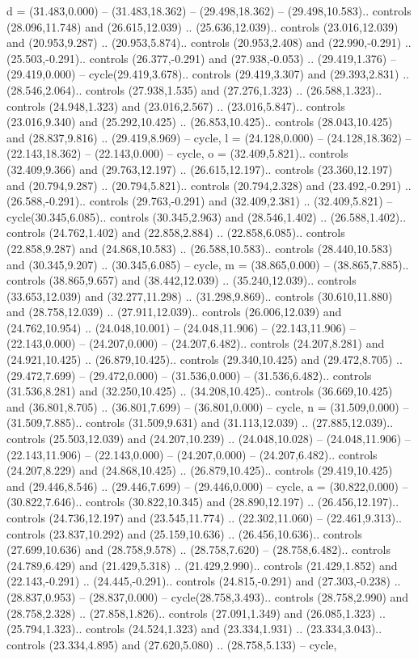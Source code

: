 {d} = {(31.483,0.000) -- (31.483,18.362) -- (29.498,18.362) -- (29.498,10.583).. controls (28.096,11.748) and (26.615,12.039) .. (25.636,12.039).. controls (23.016,12.039) and (20.953,9.287) .. (20.953,5.874).. controls (20.953,2.408) and (22.990,-0.291) .. (25.503,-0.291).. controls (26.377,-0.291) and (27.938,-0.053) .. (29.419,1.376) -- (29.419,0.000) -- cycle(29.419,3.678).. controls (29.419,3.307) and (29.393,2.831) .. (28.546,2.064).. controls (27.938,1.535) and (27.276,1.323) .. (26.588,1.323).. controls (24.948,1.323) and (23.016,2.567) .. (23.016,5.847).. controls (23.016,9.340) and (25.292,10.425) .. (26.853,10.425).. controls (28.043,10.425) and (28.837,9.816) .. (29.419,8.969) -- cycle},
{l} = {(24.128,0.000) -- (24.128,18.362) -- (22.143,18.362) -- (22.143,0.000) -- cycle},
{o} = {(32.409,5.821).. controls (32.409,9.366) and (29.763,12.197) .. (26.615,12.197).. controls (23.360,12.197) and (20.794,9.287) .. (20.794,5.821).. controls (20.794,2.328) and (23.492,-0.291) .. (26.588,-0.291).. controls (29.763,-0.291) and (32.409,2.381) .. (32.409,5.821) -- cycle(30.345,6.085).. controls (30.345,2.963) and (28.546,1.402) .. (26.588,1.402).. controls (24.762,1.402) and (22.858,2.884) .. (22.858,6.085).. controls (22.858,9.287) and (24.868,10.583) .. (26.588,10.583).. controls (28.440,10.583) and (30.345,9.207) .. (30.345,6.085) -- cycle},
{m} = {(38.865,0.000) -- (38.865,7.885).. controls (38.865,9.657) and (38.442,12.039) .. (35.240,12.039).. controls (33.653,12.039) and (32.277,11.298) .. (31.298,9.869).. controls (30.610,11.880) and (28.758,12.039) .. (27.911,12.039).. controls (26.006,12.039) and (24.762,10.954) .. (24.048,10.001) -- (24.048,11.906) -- (22.143,11.906) -- (22.143,0.000) -- (24.207,0.000) -- (24.207,6.482).. controls (24.207,8.281) and (24.921,10.425) .. (26.879,10.425).. controls (29.340,10.425) and (29.472,8.705) .. (29.472,7.699) -- (29.472,0.000) -- (31.536,0.000) -- (31.536,6.482).. controls (31.536,8.281) and (32.250,10.425) .. (34.208,10.425).. controls (36.669,10.425) and (36.801,8.705) .. (36.801,7.699) -- (36.801,0.000) -- cycle},
{n} = {(31.509,0.000) -- (31.509,7.885).. controls (31.509,9.631) and (31.113,12.039) .. (27.885,12.039).. controls (25.503,12.039) and (24.207,10.239) .. (24.048,10.028) -- (24.048,11.906) -- (22.143,11.906) -- (22.143,0.000) -- (24.207,0.000) -- (24.207,6.482).. controls (24.207,8.229) and (24.868,10.425) .. (26.879,10.425).. controls (29.419,10.425) and (29.446,8.546) .. (29.446,7.699) -- (29.446,0.000) -- cycle},
{a} = {(30.822,0.000) -- (30.822,7.646).. controls (30.822,10.345) and (28.890,12.197) .. (26.456,12.197).. controls (24.736,12.197) and (23.545,11.774) .. (22.302,11.060) -- (22.461,9.313).. controls (23.837,10.292) and (25.159,10.636) .. (26.456,10.636).. controls (27.699,10.636) and (28.758,9.578) .. (28.758,7.620) -- (28.758,6.482).. controls (24.789,6.429) and (21.429,5.318) .. (21.429,2.990).. controls (21.429,1.852) and (22.143,-0.291) .. (24.445,-0.291).. controls (24.815,-0.291) and (27.303,-0.238) .. (28.837,0.953) -- (28.837,0.000) -- cycle(28.758,3.493).. controls (28.758,2.990) and (28.758,2.328) .. (27.858,1.826).. controls (27.091,1.349) and (26.085,1.323) .. (25.794,1.323).. controls (24.524,1.323) and (23.334,1.931) .. (23.334,3.043).. controls (23.334,4.895) and (27.620,5.080) .. (28.758,5.133) -- cycle},
